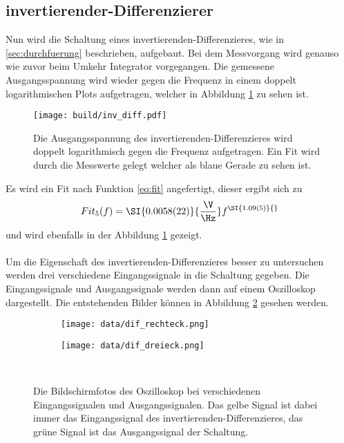 \subsection{invertierender-Differenzierer}
Nun wird die Schaltung eines invertierenden-Differenzieres, wie in \ref{sec:durchfuerung} beschrieben, aufgebaut.
Bei dem Messvorgang wird genauso wie zuvor beim Umkehr Integrator vorgegangen.
Die gemessene Ausgangsspannung wird wieder gegen die Frequenz in einem doppelt logarithmischen Plots aufgetragen, welcher in Abbildung \ref{fig:inv_diff} zu sehen ist.
\begin{figure}
    \centering
    \texttt{[image: build/inv\_diff.pdf]}
    \caption{Die Ausgangsspannung des invertierenden-Differenzieres wird doppelt logarithmisch gegen die Frequenz aufgetragen.
    Ein Fit wird durch die Messwerte gelegt welcher als blaue Gerade zu sehen ist.}
    \label{fig:inv_diff}
\end{figure}
Es wird ein Fit nach Funktion \eqref{eq:fit} angefertigt, dieser ergibt sich zu 
\begin{equation*}
    Fit_5(f) = \SI{0.0058(22)}{\frac{\V}{\Hz}} f^{\SI{1.09(5)}{}}
\end{equation*}
und wird ebenfalls in der Abbildung \ref{fig:inv_diff} gezeigt.\\\\
Um die Eigenschaft des invertierenden-Differenzieres besser zu untersuchen werden drei verschiedene Eingangssignale in die Schaltung gegeben.
Die Eingangssignale und Ausgangssignale werden dann auf einem Oszilloskop dargestellt.
Die entstehenden Bilder können in Abbildung \ref{fig:dif_oszi} gesehen werden.
\begin{figure}
    \centering
    \begin{subfigure}{0.49\linewidth}%
        \texttt{[image: data/dif\_rechteck.png]}
    \end{subfigure}
    \hfill
    \begin{subfigure}{0.49\linewidth}%
        \texttt{[image: data/dif\_dreieck.png]}
    \end{subfigure}\\
    \caption{Die Bildschirmfotos des Oszilloskop bei verschiedenen Eingangssignalen und Ausgangssignalen.
    Das gelbe Signal ist dabei immer das Eingangssignal des invertierenden-Differenzieres, das grüne Signal ist das Ausgangssignal der Schaltung.}
    \label{fig:dif_oszi}
\end{figure}
\FloatBarrier
